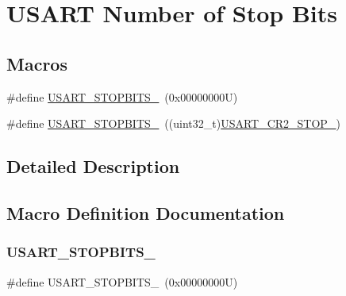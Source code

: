 \hypertarget{group___u_s_a_r_t___stop___bits}{}\section{U\+S\+A\+RT Number of Stop Bits}
\label{group___u_s_a_r_t___stop___bits}
\subsection*{Macros}
\begin{DoxyCompactItemize}
\item 
\#define \hyperlink{group___u_s_a_r_t___stop___bits_ga82aae3118e9cd59bb270c028e21c23b4}{U\+S\+A\+R\+T\+\_\+\+S\+T\+O\+P\+B\+I\+T\+S\+\_}~(0x00000000\+U)
\item 
\#define \hyperlink{group___u_s_a_r_t___stop___bits_gaf8d022e62f55ceb7b5e03eea336b5c45}{U\+S\+A\+R\+T\+\_\+\+S\+T\+O\+P\+B\+I\+T\+S\+\_}~((uint32\+\_\+t)\hyperlink{group___peripheral___registers___bits___definition_ga2b24d14f0e5d1c76c878b08aad44d02b}{U\+S\+A\+R\+T\+\_\+\+C\+R2\+\_\+\+S\+T\+O\+P\+\_})
\end{DoxyCompactItemize}


\subsection{Detailed Description}


\subsection{Macro Definition Documentation}
\mbox{\label{group___u_s_a_r_t___stop___bits_ga82aae3118e9cd59bb270c028e21c23b4}} 
\subsubsection{\texorpdfstring{U\+S\+A\+R\+T\+\_\+\+S\+T\+O\+P\+B\+I\+T\+S\+\_}{USART\_STOPBITS\_1}}
{\footnotesize\ttfamily \#define U\+S\+A\+R\+T\+\_\+\+S\+T\+O\+P\+B\+I\+T\+S\+\_~(0x00000000\+U)}

